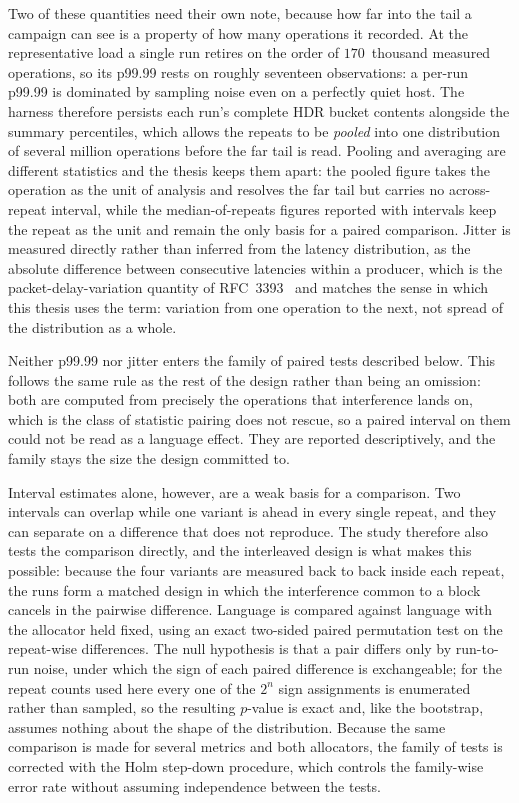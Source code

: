 \documentclass[english,twoside,openright,a4paper,censored,csm,software-track-2020]{HYthesisML}
\begin{document}
Two of these quantities need their own note, because how far into the tail a campaign can see
is a property of how many operations it recorded. At the representative load a single run
retires on the order of $170$~thousand measured operations, so its p99.99 rests on roughly
seventeen observations: a per-run p99.99 is dominated by sampling noise even on a perfectly
quiet host. The harness therefore persists each run's complete HDR bucket contents alongside
the summary percentiles, which allows the repeats to be \emph{pooled} into one distribution of
several million operations before the far tail is read. Pooling and averaging are different
statistics and the thesis keeps them apart: the pooled figure takes the operation as the unit
of analysis and resolves the far tail but carries no across-repeat interval, while the
median-of-repeats figures reported with intervals keep the repeat as the unit and remain the
only basis for a paired comparison. Jitter is measured directly rather than inferred from the
latency distribution, as the absolute difference between consecutive latencies within a
producer, which is the packet-delay-variation quantity of RFC~3393~\cite{rfc3393} and matches the sense in
which this thesis uses the term: variation from one operation to the next, not spread of the
distribution as a whole.

Neither p99.99 nor jitter enters the family of paired tests described below. This
follows the same rule as the rest of the design rather than being an omission: both are
computed from precisely the operations that interference lands on, which is the class of
statistic pairing does not rescue, so a paired interval on them could not be read as a language
effect. They are reported descriptively, and the family stays the size the design committed to.

Interval estimates alone, however, are a weak basis for a comparison. Two intervals can overlap
while one variant is ahead in every single repeat, and they can separate on a difference that
does not reproduce. The study therefore also tests the comparison directly, and the interleaved
design is what makes this possible: because the four variants are measured back to back inside
each repeat, the runs form a matched design in which the interference common to a block cancels
in the pairwise difference. Language is compared against language with the allocator held
fixed, using an exact two-sided paired permutation test on the repeat-wise differences. The
null hypothesis is that a pair differs only by run-to-run noise, under which the sign of each
paired difference is exchangeable; for the repeat counts used here every one of the $2^{n}$
sign assignments is enumerated rather than sampled, so the resulting $p$-value is exact and,
like the bootstrap, assumes nothing about the shape of the distribution. Because the same
comparison is made for several metrics and both allocators, the family of tests is corrected
with the Holm step-down procedure, which controls the family-wise error rate without assuming
independence between the tests.
\end{document}
